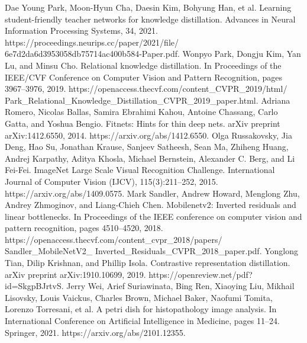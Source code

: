 \documentclass[conference]{IEEEtran}
\begin{document}
\begin{thebibliography}{00}
 Dae Young Park, Moon-Hyun Cha, Daesin Kim, Bohyung Han, et al. Learning student-friendly teacher networks for knowledge distillation. Advances in Neural Information Processing Systems, 34, 2021. https://proceedings.neurips.cc/paper/2021/file/\\6e7d2da6d3953058db75714ac400b584-Paper.pdf.
 Wonpyo Park, Dongju Kim, Yan Lu, and Minsu Cho. Relational knowledge distillation. In Proceedings of the IEEE/CVF Conference on Computer Vision and Pattern Recognition, pages 3967–3976, 2019. https://openaccess.thecvf.com/content\_CVPR\_2019/html/\\Park\_Relational\_Knowledge\_Distillation\_CVPR\_2019\_paper.html.
 Adriana Romero, Nicolas Ballas, Samira Ebrahimi Kahou, Antoine Chassang, Carlo Gatta, and Yoshua Bengio. Fitnets: Hints for thin deep nets. arXiv preprint arXiv:1412.6550, 2014. https://arxiv.org/abs/1412.6550.
 Olga Russakovsky, Jia Deng, Hao Su, Jonathan Krause, Sanjeev Satheesh, Sean Ma, Zhiheng Huang, Andrej Karpathy, Aditya Khosla, Michael Bernstein, Alexander C. Berg, and Li Fei-Fei. ImageNet Large Scale Visual Recognition Challenge. International Journal of Computer Vision (IJCV), 115(3):211–252, 2015. https://arxiv.org/abs/1409.0575.
 Mark Sandler, Andrew Howard, Menglong Zhu, Andrey Zhmoginov, and Liang-Chieh Chen. Mobilenetv2: Inverted residuals and linear bottlenecks. In Proceedings of the IEEE conference on computer vision and pattern recognition, pages 4510–4520, 2018. https://openaccess.thecvf.com/content\_cvpr\_2018/papers/\\Sandler\_MobileNetV2\_ Inverted\_Residuals\_CVPR\_2018\_paper.pdf.
 Yonglong Tian, Dilip Krishnan, and Phillip Isola. Contrastive representation distillation. arXiv preprint arXiv:1910.10699, 2019. https://openreview.net/pdf?id=SkgpBJrtvS.
 Jerry Wei, Arief Suriawinata, Bing Ren, Xiaoying Liu, Mikhail Lisovsky, Louis Vaickus, Charles Brown, Michael Baker, Naofumi Tomita, Lorenzo Torresani, et al. A petri dish for histopathology image analysis. In International Conference on Artificial Intelligence in Medicine, pages 11–24. Springer, 2021. https://arxiv.org/abs/2101.12355.

\end{thebibliography}
\end{document}
